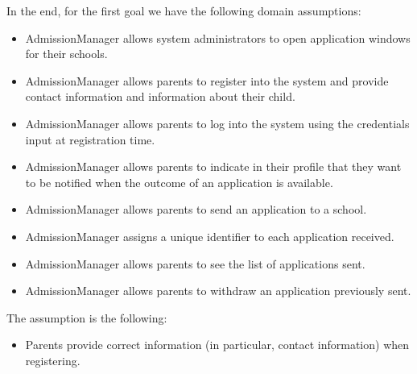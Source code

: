 \documentclass[12pt, a4paper]{report}
\newtheorem[style=M,bodystyle=\normalfont]{theorem}{Theorem}
\newtheorem[style=M,bodystyle=\normalfont]{corollary}{Corollary}
\newtheorem[style=M,bodystyle=\normalfont]{lemma}{Lemma}
\newtheorem[style=M,bodystyle=\normalfont]{definition}{Definition}
\begin{document}
\begin{enumerate}
                In the end, for the first goal we have the following domain assumptions: 
                \begin{itemize}
                    \item AdmissionManager allows system administrators to open application windows for their schools.
                    \item AdmissionManager allows parents to register into the system and provide contact information and information about their child. 
                    \item AdmissionManager allows parents to log into the system using the credentials input at registration time.
                    \item AdmissionManager allows parents to indicate in their profile that they want to be notified when the outcome of an application is available. 
                    \item AdmissionManager allows parents to send an application to a school. 
                    \item AdmissionManager assigns a unique identifier to each application received. 
                    \item AdmissionManager allows parents to see the list of applications sent.
                    \item AdmissionManager allows parents to withdraw an application previously sent.
                \end{itemize}
                The assumption is the following: 
                \begin{itemize}
                    \item Parents provide correct information (in particular, contact information) when registering.
                \end{itemize}


\end{enumerate}
\end{document}
